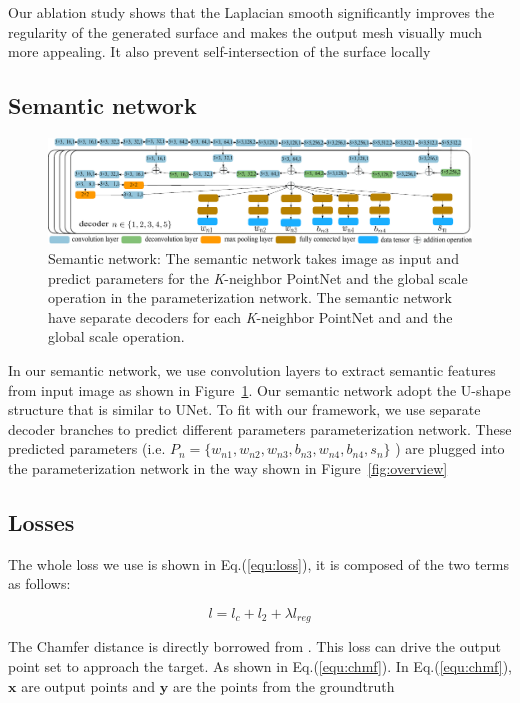 Our ablation study shows that the Laplacian smooth significantly improves the regularity of the generated surface and makes the output mesh visually much more appealing. It also prevent self-intersection of the surface locally
\subsection{Semantic network}
\label{subsec:semnet}

\begin{figure}[htbp]
	\centering
	\includegraphics[width=\linewidth]{img/net/semnet}
	\caption{Semantic network: The semantic network takes image as input and predict parameters for the \textit{K}-neighbor PointNet and the global scale operation in the parameterization network. The semantic network have separate decoders for each \textit{K}-neighbor PointNet and and the global scale operation.}
	\label{fig:semnet}
\end{figure}

In our semantic network, we use convolution layers to extract semantic features from input image as shown in Figure~\ref{fig:semnet}.  Our semantic network adopt the U-shape structure that is similar to UNet\citep{unet}. To fit with our framework, we use separate decoder branches to predict different parameters parameterization network. These predicted parameters (i.e. $P_n=\{w_{n1},w_{n2},w_{n3},b_{n3},w_{n4},b_{n4},s_{n}\}$ ) are plugged into the parameterization network in the way shown in Figure~\ref{fig:overview}

\subsection{Losses}
The whole loss we use is shown in Eq.(\ref{equ:loss}), it is composed of the two terms as follows:

\begin{equation}
\label{equ:loss}
l = l_c + l_2 + \lambda l_{reg} 
\end{equation}

 The Chamfer distance is directly borrowed from \citep{PSGN}. This loss can drive the output point set to approach the target. As shown in Eq.(\ref{equ:chmf}). In Eq.(\ref{equ:chmf}), $\mathbf{x}$ are output points and $\mathbf{y}$ are the points from the groundtruth

